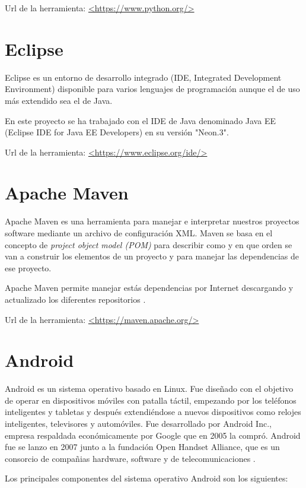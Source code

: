 Url de la herramienta: \url{<https://www.python.org/>}

\section{Eclipse}

Eclipse es un entorno de desarrollo integrado (IDE, Integrated Development Environment) disponible para varios lenguajes de programación aunque el de uso más extendido sea el de Java. 

En este proyecto se ha trabajado con el IDE de Java denominado Java EE (Eclipse IDE for Java EE Developers) en su versión "Neon.3".

Url de la herramienta: \url{<https://www.eclipse.org/ide/>}

\section{Apache Maven}

Apache Maven es una herramienta para manejar e interpretar nuestros proyectos software mediante un archivo de configuración XML. Maven se basa en el concepto de \textit{project object model (POM)} para describir como y en que orden se van a construir los elementos de un proyecto y para manejar las dependencias de ese proyecto.

Apache Maven permite manejar estás dependencias por Internet descargando y actualizado los diferentes repositorios \cite{wiki:maven}.

Url de la herramienta: \url{<https://maven.apache.org/>}

\section{Android}

Android es un sistema operativo basado en Linux. Fue diseñado con el objetivo de operar en dispositivos móviles con patalla táctil, empezando por los teléfonos inteligentes y tabletas y después extendiéndose a nuevos dispositivos como relojes inteligentes, televisores y automóviles. Fue desarrollado por Android Inc., empresa respaldada económicamente por Google que en 2005 la compró. Android fue se lanzo en 2007 junto a la fundación Open Handset Alliance, que es un consorcio de compañias hardware, software y de telecomunicaciones \cite{wiki:android}.

Los principales componentes del sistema operativo Android son los siguientes:

